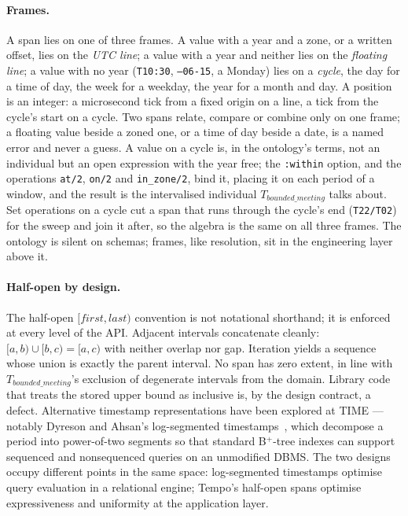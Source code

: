 \paragraph*{Frames.} A span lies on one of three frames. A value with a
year and a zone, or a written offset, lies on the \emph{UTC line}; a
value with a year and neither lies on the \emph{floating line}; a value
with no year (\texttt{T10:30}, \texttt{--06-15}, a Monday) lies on a
\emph{cycle}, the day for a time of day, the week for a weekday, the
year for a month and day. A position is an integer: a microsecond tick
from a fixed origin on a line, a tick from the cycle's start on a
cycle. Two spans relate, compare or combine only on one frame; a
floating value beside a zoned one, or a time of day beside a date, is a
named error and never a guess. A value on a cycle is, in the ontology's
terms, not an individual but an open expression with the year free; the
\texttt{:within} option, and the operations \texttt{at/2},
\texttt{on/2} and \texttt{in\_zone/2}, bind it, placing it on each
period of a window, and the result is the intervalised individual
$T_{bounded\_meeting}$ talks about. Set operations on a cycle cut a
span that runs through the cycle's end (\texttt{T22/T02}) for the
sweep and join it after, so the algebra is the same on all three
frames. The ontology is silent on schemas; frames, like resolution,
sit in the engineering layer above it.

\paragraph*{Half-open by design.} The half-open $[\mathit{first},
\mathit{last})$ convention is not notational shorthand; it is enforced
at every level of the API. Adjacent intervals concatenate cleanly:
$[a, b) \cup [b, c) = [a, c)$ with neither overlap nor gap. Iteration
yields a sequence whose union is exactly the parent interval. No span
has zero extent, in line with $T_{bounded\_meeting}$'s exclusion of
degenerate intervals from the domain. Library code that treats the
stored upper bound as inclusive is, by the design contract, a defect.
Alternative timestamp representations have been explored at TIME ---
notably Dyreson and Ahsan's log-segmented
timestamps~\cite{dyreson2021logsegmented,dyreson2023logsegmented},
which decompose a period into power-of-two segments so that standard
B$^+$-tree indexes can support sequenced and nonsequenced queries on
an unmodified DBMS. The two designs occupy different points in the
same space: log-segmented timestamps optimise query evaluation in a
relational engine; Tempo's half-open spans optimise expressiveness
and uniformity at the application layer.

